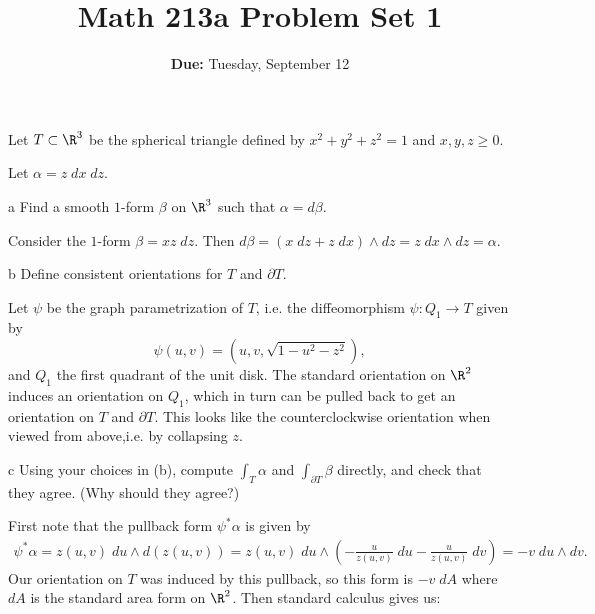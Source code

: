 \documentclass[11pt,letterpaper]{article}
\title{\textbf{Math 213a Problem Set 1}}
\date{\textbf{Due: } Tuesday, September 12}
\begin{document}
\maketitle

\begin{problem}\noindent
    Let $T\subset \R^3$ be the spherical triangle defined by $x^2+y^2+z^2=1$ and $x,y,z\geq 0$.
\end{problem}

\begin{solution}
    Let $\alpha = z\;dx\;dz$.

    \begin{partproblem}{a}
        Find a smooth $1$-form $\beta$ on $\R^3$ such that $\alpha = d\beta$.
    \end{partproblem}

    \quad Consider the $1$-form $\beta = xz\; dz$. Then $d\beta = (x\; dz + z\; dx)\wedge dz = z\;dx\wedge dz = \alpha$.

    \begin{partproblem}{b}
        Define consistent orientations for $T$ and $\partial T$.
    \end{partproblem}

    \quad Let $\psi$ be the graph parametrization of $T$, i.e. the diffeomorphism $\psi : Q_1 \to T$ given by \[\psi(u,v)=(u,v,\sqrt{1-u^2-z^2}),\] and $Q_1$ the first quadrant of the unit disk. The standard orientation on $\R^2$ induces an orientation on $Q_1$, which in turn can be pulled back to get an orientation on $T$ and $\partial T$. This looks like the counterclockwise orientation when viewed from above,i.e. by collapsing $z$.

    \begin{partproblem}{c}
        Using your choices in (b), compute $\int_T \alpha$ and $\int_{\partial T} \beta$ directly, and check that they agree. (Why should they agree?)
    \end{partproblem}

    \quad First note that the pullback form $\psi^*\alpha$ is given by
    \[
        \begin{aligned}
            \psi^*\alpha = z(u,v)\;du\wedge d(z(u,v)) = z(u,v)\;du\wedge \left(-\frac{u}{z(u,v)}\;du-\frac{u}{z(u,v)}\;dv\right) = -v\;du\wedge dv.
        \end{aligned}
    \] 
    Our orientation on $T$ was induced by this pullback, so this form is $-v\;dA$ where $dA$ is the standard area form on $\R^2$. Then standard calculus gives us:


\end{solution}
\end{document}
